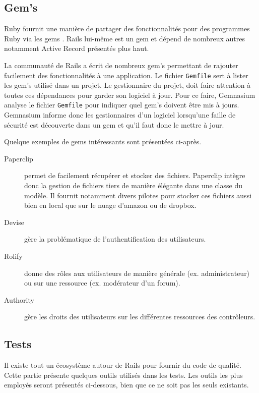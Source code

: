 \subsection{Gem's}
\label{gems}
Ruby fournit une manière de partager des fonctionnalités pour des programmes Ruby via les gems \cite{gem}. Rails lui-même est un gem et dépend de nombreux autres notamment Active Record présentés plus haut.

\label{gemnasium}
La communauté de Rails a écrit de nombreux gem's permettant de rajouter facilement des fonctionnalités à une application. Le fichier \texttt{Gemfile} sert à lister les gem's utilisé dans un projet. Le gestionnaire du projet, doit faire attention à toutes ces dépendances pour garder son logiciel à jour. Pour ce faire, Gemnasium analyse le fichier \texttt{Gemfile} pour indiquer quel gem's doivent être mis à jours. Gemnasium informe donc les gestionnaires d'un logiciel lorsqu'une faille de sécurité est découverte dans un gem et qu'il faut donc le mettre à jour.

Quelque exemples de gems intéressants sont présentées ci-après.
\begin{description}
  \item[Paperclip \cite{paperclip}] permet de facilement récupérer et stocker des fichiers. Paperclip intègre donc la gestion de fichiers tiers de manière élégante dans une classe du modèle. Il fournit notamment divers pilotes pour stocker ces fichiers aussi bien en local que sur le nuage d'amazon ou de dropbox.
  \item[Devise \cite{devise}] gère la problématique de l'authentification des utilisateurs.
  \item[Rolify \cite{rolify}] donne des rôles aux utilisateurs de manière générale (ex. administrateur) ou sur une ressource (ex. modérateur d'un forum).\label{rolify}
  \item[Authority \cite{authority}] gère les droits des utilisateurs sur les différentes ressources des contrôleurs. \label{authority}
\end{description}

\subsection{Tests}
\label{rails-tests}
Il existe tout un écosystème autour de Rails pour fournir du code de qualité. Cette partie présente quelques outils utilisés dans les tests. Les outils les plus employés seront présentés ci-dessous, bien que ce ne soit pas les seuls existants.

